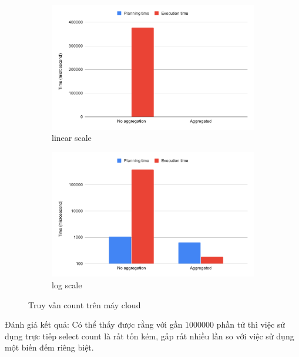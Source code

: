 \begin{figure}[H]
\centering
\begin{subfigure}{0.5\textwidth}
    \centering
    \includegraphics[width=\textwidth]{images/testing/count-cloud.png}
    \caption{linear scale}
\end{subfigure}%
\begin{subfigure}{0.5\textwidth}
    \centering
    \includegraphics[width=\textwidth]{images/testing/count-cloud-log.png}
    \caption{log scale}
\end{subfigure}
\caption{Truy vấn count trên máy cloud}
\end{figure}

Đánh giá kết quả: Có thể thấy được rằng với gần $1000000$ phần tử thì
việc sử dụng trực tiếp select count là rất tốn kém, gấp rất nhiều lần
so với việc sử dụng một biến đếm riêng biệt.

